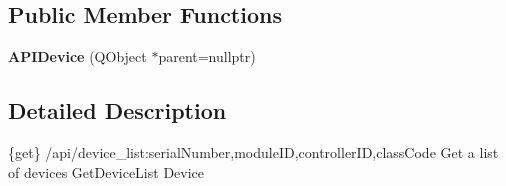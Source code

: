 \subsection*{Public Member Functions}
\begin{DoxyCompactItemize}
\item 
\mbox{\label{class_a_p_i_device_ab983034826edbff2b4246002b22081a5}} 
{\bfseries A\+P\+I\+Device} (Q\+Object $\ast$parent=nullptr)
\end{DoxyCompactItemize}


\subsection{Detailed Description}
\{get\} /api/device\+\_\+list\+:serial\+Number,module\+ID,controller\+ID,class\+Code Get a list of devices  Get\+Device\+List  Device

